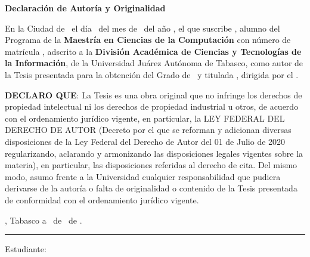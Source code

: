 \thispagestyle{empty}
\large

\begin{center}
    \textbf{\Large Declaración de Autoría y Originalidad}
\end{center}

\vspace{1cm}

En la Ciudad de \Ciudad\ el día \DiaLetra\ del mes de \Mes\ del año \Anho,
el que suscribe \textbf{\Autor}, alumno del Programa de la
\textbf{Maestría en Ciencias de la Computación} con número de matrícula
\textbf{\Matricula}, adscrito a la
\textbf{División Académica de Ciencias y Tecnologías de la Información},
de la Universidad Juárez Autónoma de Tabasco,
como autor de la Tesis presentada para la obtención del Grado de \Nivel\
y titulada \textbf{\Titulo}, dirigida por el \Director.

\vspace{0.5cm}

\textbf{DECLARO QUE}: La Tesis es una obra original que no infringe los
derechos de propiedad intelectual ni los derechos de propiedad industrial u
otros, de acuerdo con el ordenamiento jurídico vigente, en particular, la
LEY FEDERAL DEL DERECHO DE AUTOR (Decreto por el que se reforman y adicionan
diversas disposiciones de la Ley Federal del Derecho de Autor del 01 de Julio
de 2020 regularizando, aclarando y armonizando las disposiciones legales
vigentes sobre la materia), en particular, las disposiciones referidas al
derecho de cita. Del mismo modo, asumo frente a la Universidad cualquier
responsabilidad que pudiera derivarse de la autoría o falta de originalidad o
contenido de la Tesis presentada de conformidad con el ordenamiento jurídico
vigente.

\vspace{1cm}

\Ciudad, Tabasco a \Dia\ de \Mes\ de \Anho.

\vspace{3cm}

\begin{center}
    \rule{8cm}{0.4pt}
\end{center}

\begin{center}
    Estudiante: \Autor
\end{center}

\normalsize
